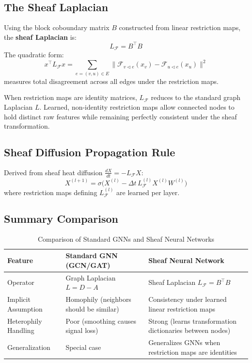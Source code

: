 \documentclass[12pt,a4paper]{article}
\begin{document}
\subsection{The Sheaf Laplacian}

\begin{definition}
Using the block coboundary matrix $B$ constructed from linear restriction maps, the \textbf{sheaf Laplacian} is:
\[
L_{\mathcal{F}} = B^\top B
\]
The quadratic form:
\[
x^\top L_{\mathcal{F}} x = \sum_{e=(v,u)\in E} \big\| \mathcal{F}_{v \triangleleft e}(x_v) - \mathcal{F}_{u \triangleleft e}(x_u) \big\|^2
\]
measures total disagreement across all edges under the restriction maps.
\end{definition}

When restriction maps are identity matrices, $L_{\mathcal{F}}$ reduces to the standard graph Laplacian $L$. Learned, non-identity restriction maps allow connected nodes to hold distinct raw features while remaining perfectly consistent under the sheaf transformation.

\subsection{Sheaf Diffusion Propagation Rule}

Derived from sheaf heat diffusion $\frac{dX}{dt} = -L_{\mathcal{F}} X$:
\[
X^{(l+1)} = \sigma\Big(X^{(l)} - \Delta t\, L_{\mathcal{F}}^{(l)} X^{(l)} W^{(l)}\Big)
\]
where restriction maps defining $L_{\mathcal{F}}^{(l)}$ are learned per layer.

\subsection{Summary Comparison}

\begin{table}[h!]
\centering
\renewcommand{\arraystretch}{1.3}
\begin{tabular}{|l|p{5cm}|p{5cm}|}
\hline
\textbf{Feature} & \textbf{Standard GNN (GCN/GAT)} & \textbf{Sheaf Neural Network} \\
\hline
Operator & Graph Laplacian $L = D-A$ & Sheaf Laplacian $L_{\mathcal{F}} = B^\top B$ \\
Implicit Assumption & Homophily (neighbors should be similar) & Consistency under learned linear restriction maps \\
Heterophily Handling & Poor (smoothing causes signal loss) & Strong (learns transformation dictionaries between nodes) \\
Generalization & Special case & Generalizes GNNs when restriction maps are identities \\
\hline
\end{tabular}
\caption{Comparison of Standard GNNs and Sheaf Neural Networks}
\end{table}
\end{document}
